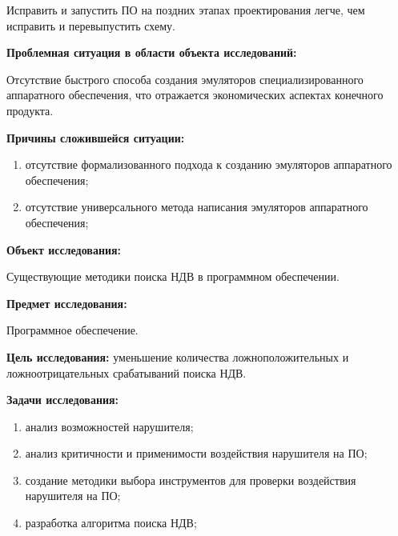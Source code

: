Исправить и запустить ПО на поздних этапах проектирования легче, чем исправить и перевыпустить схему.

\textbf{Проблемная ситуация в области объекта исследований:}

Отсутствие быстрого способа создания эмуляторов специализированного аппаратного обеспечения, что отражается
экономических аспектах конечного продукта.

\textbf{Причины сложившейся ситуации:}
\begin{enumerate}[label={\arabic*)}]
    \item отсутствие формализованного подхода к созданию эмуляторов аппаратного обеспечения;
    \item отсутствие универсального метода написания эмуляторов аппаратного обеспечения;
\end{enumerate}

\textbf{Объект исследования:}

Существующие методики поиска НДВ в программном обеспечении.

\textbf{Предмет исследования:}

Программное обеспечение.

\textbf{Цель исследования:}
уменьшение количества ложноположительных и ложноотрицательных срабатываний поиска НДВ.

\textbf{Задачи исследования:}
\begin{enumerate}[label={\arabic*)}]
    \item анализ возможностей нарушителя;
    \item анализ критичности и применимости воздействия нарушителя на ПО;
    \item создание методики выбора инструментов для проверки воздействия нарушителя на ПО;
    \item разработка алгоритма поиска НДВ;
\end{enumerate}
